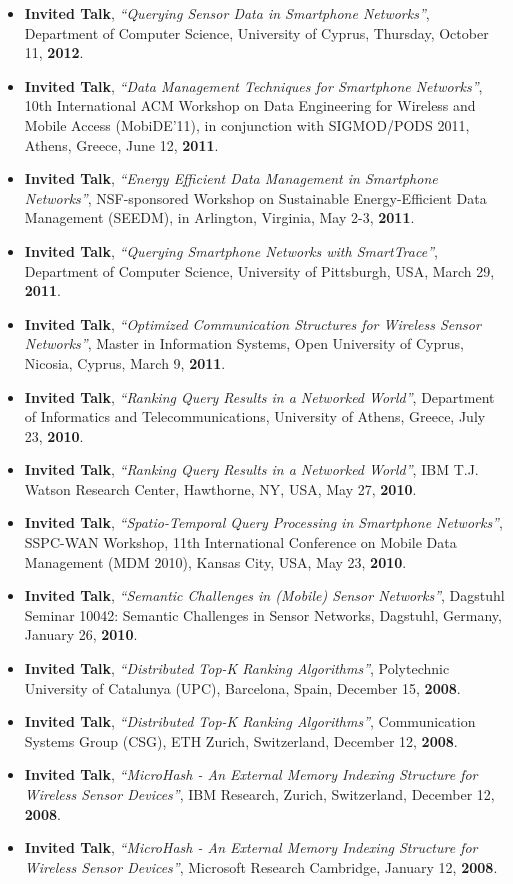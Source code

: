 \documentclass[10pt]{article}
\begin{document}
\begin{itemize}
\item  {\bf Invited Talk}, {\em ``Querying Sensor Data in Smartphone Networks''}, Department of Computer Science, University of Cyprus, Thursday, October 11, {\bf 2012}.

\item  {\bf Invited Talk}, {\em ``Data Management Techniques for Smartphone Networks''}, 10th International ACM Workshop on Data Engineering for Wireless and Mobile Access (MobiDE'11), in conjunction with SIGMOD/PODS 2011, Athens, Greece, June 12, {\bf 2011}.
\item  {\bf Invited Talk}, {\em ``Energy Efficient Data Management in Smartphone Networks''},  NSF-sponsored Workshop on Sustainable Energy-Efficient Data Management (SEEDM), in Arlington, Virginia, May 2-3, {\bf 2011}. 
\item  {\bf Invited Talk}, {\em ``Querying Smartphone Networks with SmartTrace''}, Department of Computer Science, University of Pittsburgh, USA, March 29, {\bf 2011}.
\item  {\bf Invited Talk}, {\em ``Optimized Communication Structures for Wireless Sensor Networks''}, Master in Information Systems, Open University of Cyprus, Nicosia, Cyprus, March 9, {\bf 2011}.

\item  {\bf Invited Talk}, {\em ``Ranking Query Results in a Networked World''}, Department of Informatics and Telecommunications, University of Athens, Greece,  July 23, {\bf 2010}.
\item  {\bf Invited Talk}, {\em ``Ranking Query Results in a Networked World''},  IBM T.J. Watson Research Center, Hawthorne, NY, USA, May 27, {\bf 2010}.
\item  {\bf Invited Talk}, {\em ``Spatio-Temporal Query Processing in Smartphone Networks''},  SSPC-WAN Workshop, 11th International Conference on Mobile Data Management (MDM 2010), Kansas City, USA, May 23, {\bf 2010}.
\item  {\bf Invited Talk}, {\em ``Semantic Challenges in (Mobile) Sensor Networks''},  Dagstuhl Seminar 10042: Semantic Challenges in Sensor Networks, Dagstuhl, Germany, January 26, {\bf 2010}.


\item  {\bf Invited Talk}, {\em ``Distributed Top-K Ranking Algorithms''}, Polytechnic University of Catalunya (UPC), Barcelona, Spain, December 15, {\bf 2008}.
\item  {\bf Invited Talk}, {\em ``Distributed Top-K Ranking Algorithms''}, Communication Systems Group (CSG), ETH Zurich, Switzerland, December 12, {\bf 2008}.
\item  {\bf Invited Talk}, {\em ``MicroHash - An External Memory Indexing Structure for Wireless Sensor Devices''}, IBM Research, Zurich, Switzerland, December 12, {\bf 2008}.
\item  {\bf Invited Talk}, {\em ``MicroHash - An External Memory Indexing Structure for Wireless Sensor Devices''}, Microsoft Research Cambridge, January 12, {\bf 2008}.


\end{itemize}
\end{document}
